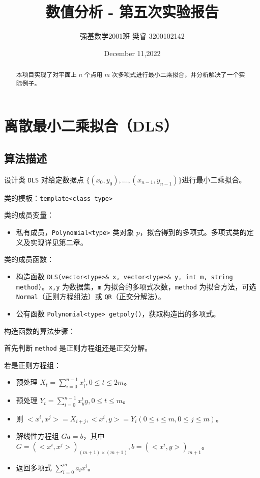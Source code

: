 \documentclass{ctexart}
\title{数值分析 - 第五次实验报告}
\author{强基数学2001班 樊睿 3200102142}
\date{December 11,2022}
\begin{document}
\maketitle

\begin{abstract}
本项目实现了对平面上 $n$ 个点用 $m$ 次多项式进行最小二乘拟合，并分析解决了一个实际例子。
\end{abstract}


\section{离散最小二乘拟合（DLS）}

\subsection{算法描述}
设计类 \verb|DLS| 对给定数据点 $\{(x_0,y_0),\dots,(x_{n-1},y_{n-1})\}$进行最小二乘拟合。

类的模板：\verb|template<class type>|

类的成员变量：
\begin{itemize}
\item 私有成员，\verb|Polynomial<type>| 类对象 $p$，拟合得到的多项式。多项式类的定义及实现详见第二章。
\end{itemize}

类的成员函数：
\begin{itemize}
\item 构造函数 \verb|DLS(vector<type>& x, vector<type>& y, int m, string method)|。\verb|x,y| 为数据集，\verb|m| 为拟合的多项式次数，\verb|method| 为拟合方法，可选 \verb|Normal|（正则方程组法）或 \verb|QR|（正交分解法）。
\item 公有函数 \verb|Polynomial<type> getpoly()|，获取构造出的多项式。
\end{itemize}

构造函数的算法步骤：

首先判断 \verb|method| 是正则方程组还是正交分解。

若是正则方程组：
\begin{itemize}
\item 预处理 $X_t=\sum_{i=0}^{n-1}x_i^t,0\leq t\leq 2m$。
\item 预处理 $Y_t=\sum_{i=0}^{n-1}x_y^ty,0\leq t\leq m$。
\item 则 $<x^i,x^j>=X_{i+j},<x^i,y>=Y_i(0\leq i\leq m,0\leq j\leq m)$。
\item 解线性方程组 $Ga=b$，其中 $G=(<x^i,x^j>)_{(m+1)\times (m+1)},b=(<x^i,y>)_{m+1}$。
\item 返回多项式 $\sum_{i=0}^ma_ix^i$。
\end{itemize}
\end{document}
